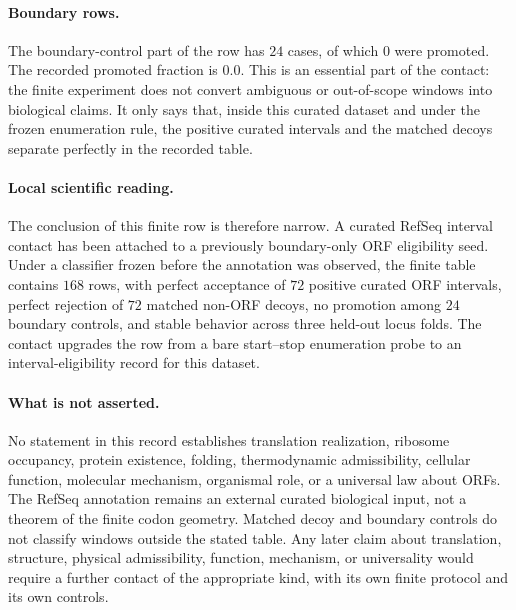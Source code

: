 \paragraph{Boundary rows.}
The boundary-control part of the row has $24$ cases, of which $0$ were promoted.  The recorded promoted fraction is $0.0$.  This is an essential part of the contact: the finite experiment does not convert ambiguous or out-of-scope windows into biological claims.  It only says that, inside this curated dataset and under the frozen enumeration rule, the positive curated intervals and the matched decoys separate perfectly in the recorded table.

\paragraph{Local scientific reading.}
The conclusion of this finite row is therefore narrow.  A curated RefSeq interval contact has been attached to a previously boundary-only ORF eligibility seed.  Under a classifier frozen before the annotation was observed, the finite table contains $168$ rows, with perfect acceptance of $72$ positive curated ORF intervals, perfect rejection of $72$ matched non-ORF decoys, no promotion among $24$ boundary controls, and stable behavior across three held-out locus folds.  The contact upgrades the row from a bare start--stop enumeration probe to an interval-eligibility record for this dataset.

\paragraph{What is not asserted.}
No statement in this record establishes translation realization, ribosome occupancy, protein existence, folding, thermodynamic admissibility, cellular function, molecular mechanism, organismal role, or a universal law about ORFs.  The RefSeq annotation remains an external curated biological input, not a theorem of the finite codon geometry.  Matched decoy and boundary controls do not classify windows outside the stated table.  Any later claim about translation, structure, physical admissibility, function, mechanism, or universality would require a further contact of the appropriate kind, with its own finite protocol and its own controls.